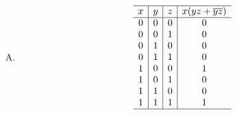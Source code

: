 {{\begin{practices}
\begin{enumerate}[A.]
{\begin{table}[H]
                        \[
                            \begin{array}{c|c|c|c}
                                \hline
                                x & y & z & x\overline{y} + \overline{xyz} \\
                                \hline
                                0 & 0 & 0 & 1 \\
                                0 & 0 & 1 & 1 \\
                                0 & 1 & 0 & 1 \\
                                0 & 1 & 1 & 1 \\
                                1 & 0 & 0 & 1 \\
                                1 & 0 & 1 & 1 \\
                                1 & 1 & 0 & 1 \\
                                1 & 1 & 1 & 0 \\
                                \hline
                            \end{array}
                        \]
                    \end{table}
                }
                \item
                {
                    \begin{table}[H]
                        \centering

                        \[
                            \begin{array}{c|c|c|c}
                                \hline
                                x & y & z & x(yz + \overline{y}\overline{z}) \\
                                \hline
                                0 & 0 & 0 & 0 \\
                                0 & 0 & 1 & 0 \\
                                0 & 1 & 0 & 0 \\
                                0 & 1 & 1 & 0 \\
                                1 & 0 & 0 & 1 \\
                                1 & 0 & 1 & 0 \\
                                1 & 1 & 0 & 0 \\
                                1 & 1 & 1 & 1 \\
                                \hline
                            \end{array}
                        \]
                    \end{table}
                }
            \end{enumerate}
        \end{practices}

}}
